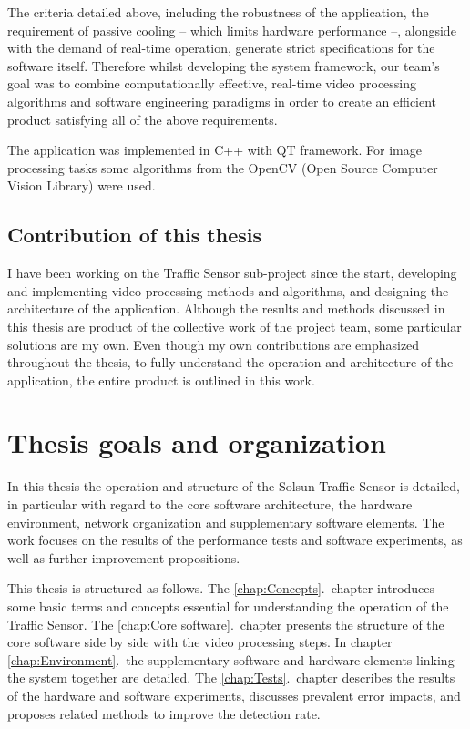 The criteria detailed above, including the robustness of the application, the requirement of passive cooling -- which limits hardware performance --, alongside with the demand of real-time operation, generate strict specifications for the software itself.
Therefore whilst developing the system framework, our team's goal was to combine computationally effective, real-time video processing algorithms and software engineering paradigms in order to create an efficient product satisfying all of the above requirements.

The application was implemented in C++ with QT framework.
For image processing tasks some algorithms from the OpenCV (Open Source Computer Vision Library) were used.

\subsection{Contribution of this thesis}

I have been working on the Traffic Sensor sub-project since the start, developing and implementing video processing methods and algorithms, and designing the architecture of the application.
Although the results and methods discussed in this thesis are product of the collective work of the project team, some particular solutions are my own. 
Even though my own contributions are emphasized throughout the thesis, to fully understand the operation and architecture of the application, the entire product is outlined in this work.

\section{Thesis goals and organization}
In this thesis the operation and structure of the Solsun Traffic Sensor is detailed, in particular with regard to the core software architecture, the hardware environment, network organization and supplementary software elements.
The work focuses on the results of the performance tests and software experiments, as well as further improvement propositions.

This thesis is structured as follows.
The \ref{chap:Concepts}.~chapter introduces some basic terms and concepts essential for understanding the operation of the Traffic Sensor. 
The \ref{chap:Core software}.~chapter presents the structure of the core software side by side with the video processing steps.
In chapter \ref{chap:Environment}.~the supplementary software and hardware elements linking the system together are detailed.
The \ref{chap:Tests}.~chapter describes the results of the hardware and software experiments, discusses prevalent error impacts, and proposes related methods to improve the detection rate.
